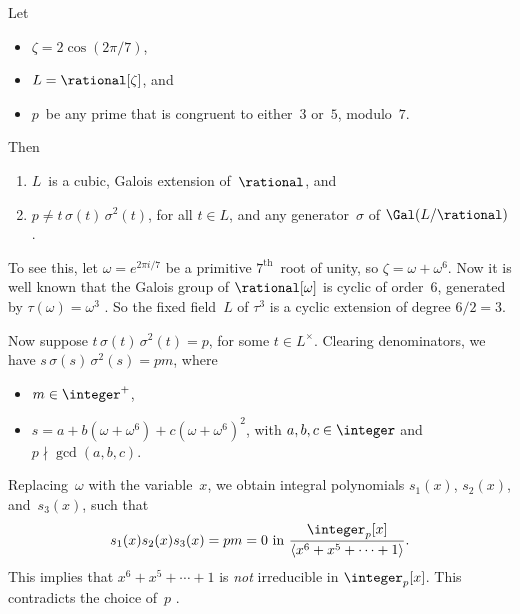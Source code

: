 \begin{eg} \label{GoodLpForSL3Rcocpct}
 Let
 \begin{itemize}
 \item $\zeta = 2 \cos(2\pi/7)$,
 \item $L = \rational[\zeta]$, and
 \item $p$~be any prime that is congruent to either~$3$
or~$5$, modulo~$7$.
 \end{itemize}
 Then
 \begin{enumerate}
 \item $L$~is a cubic, Galois extension of~$\rational$, and
 \item $p \neq t \, \sigma(t) \, \sigma^2(t)$, for all $t
\in L$, and any generator~$\sigma$ of $\Gal(L/\rational)$.
 \end{enumerate}
 To see this, let $\omega = e^{2\pi i/7}$ be a primitive
$7^\text{th}$~root of unity, so $\zeta = \omega +
\omega^6$. Now it is well known that the Galois group of
$\rational[\omega]$ is cyclic of order~$6$, generated by
$\tau(\omega) = \omega^3$ . So the
fixed field~$L$ of $\tau^3$ is a cyclic extension of degree
$6/2 = 3$.

Now suppose $t \, \sigma(t) \, \sigma^2(t) = p$, for some
$t \in L^\times$. Clearing denominators, we have $s \,
\sigma(s) \, \sigma^2(s) = pm$, where
 \begin{itemize}
 \item $m \in \integer^+$,
 \item $s = a + b (\omega+\omega^6) + c
(\omega+\omega^6)^2$, with $a,b,c \in \integer$ and $p
\nmid \gcd(a,b,c)$.
 \end{itemize}
 Replacing~$\omega$ with the variable~$x$, we obtain
integral polynomials $s_1(x)$, $s_2(x)$, and~$s_3(x)$, such that 
 $$ s_1(x) s_2(x) s_3(x) = p m = 0 \mbox{ in }
 \frac{\integer_p[x]}{\langle x^6 + x^5 + \cdots + 1
\rangle}. $$
 This implies that $x^6 + x^5 + \cdots + 1$ is \emph{not}
irreducible in $\integer_p[x]$. This contradicts the choice
of~$p$ .
 \end{eg}

